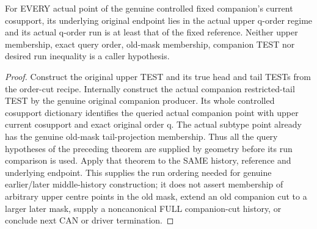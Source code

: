 \begin{theorem}
\label{hir:original-fixed-companion-cosupport-query-run-bound}
\leanok
For EVERY actual point of the genuine controlled fixed companion's current
cosupport, its underlying original endpoint lies in the actual upper q-order
regime and its actual q-order run is at least that of the fixed reference.
Neither upper membership, exact query order, old-mask membership, companion
TEST nor desired run inequality is a caller hypothesis.
\end{theorem}
\begin{proof}
Construct the original upper TEST and its true head and tail TESTs from the
order-cut recipe. Internally construct the actual companion restricted-tail
TEST by the genuine original companion producer. Its whole controlled
cosupport dictionary identifies the queried actual companion point with
upper current cosupport and exact original order q. The actual subtype point
already has the genuine old-mask tail-projection membership. Thus all the
query hypotheses of the preceding theorem are supplied by geometry before
its run comparison is used. Apply that theorem to the SAME history,
reference and underlying endpoint. This supplies the run ordering needed
for genuine earlier/later middle-history construction; it does not assert
membership of arbitrary upper centre points in the old mask, extend an
old companion cut to a larger later mask, supply a noncanonical FULL
companion-cut history, or conclude next CAN or driver termination.
\end{proof}
